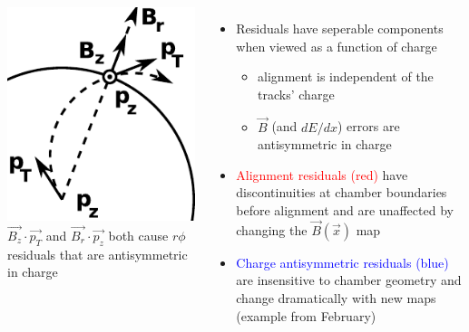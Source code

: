 \documentclass[compress]{beamer}
\begin{document}
\begin{frame}
\begin{columns}
\begin{columns}
\includegraphics[width=\linewidth]{bfield_components.pdf}
\scriptsize $\vec{B_z} \cdot \vec{p_T}$ and $\vec{B_r} \cdot \vec{p_z}$ both cause $r\phi$ residuals that are antisymmetric in charge
\end{columns}

\begin{itemize}
\item Residuals have seperable components when viewed as a function of charge
\begin{itemize}
\item alignment is independent of the tracks' charge
\item $\vec{B}$ (and $dE/dx$) errors are antisymmetric in charge
\end{itemize}

\item \textcolor{red}{Alignment residuals (red)} have discontinuities at chamber boundaries before alignment and are unaffected by changing the $\vec{B}(\vec{x})$ map

\item \textcolor{blue}{Charge antisymmetric residuals (blue)} are insensitive to chamber geometry and change dramatically with new maps
{\scriptsize (example from February)}

\end{itemize}
\end{columns}
\end{frame}
\end{document}

